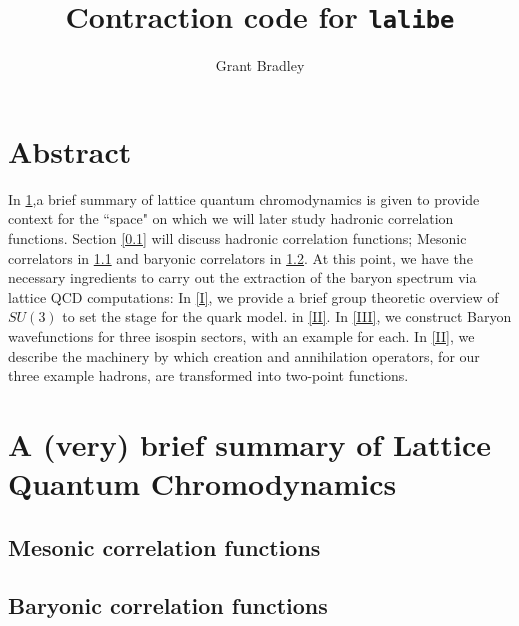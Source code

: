 \documentclass[prd,12pt,superscriptaddress,tightenlines,nofootinbib]{revtex4}
\theoremstyle{plain}
\theoremstyle{definition}
\theoremstyle{remark}
\begin{document}
\title{Contraction code for \texttt{lalibe}}

\author{Grant Bradley}


\maketitle

\section*{Abstract}
In \ref{0},a brief summary of lattice quantum chromodynamics is given to provide context for the ``space" on which we will later
study hadronic correlation functions. Section \ref{0.1} will discuss hadronic correlation functions; Mesonic correlators in \ref{0.1m} and 
baryonic correlators in \ref{0.1b}. At this point, we have the necessary ingredients to carry out the extraction of the baryon spectrum via lattice QCD computations: In \ref{I}, 
we provide a brief group theoretic overview of $SU(3)$ to set the stage for the quark model. 
in \ref{II}. In \ref{III}, we construct Baryon wavefunctions for three isospin sectors,
with an example for each. In \ref{II}, we describe the machinery by which creation and annihilation 
operators, for our three example hadrons, are transformed into two-point functions. 


\section{A (very) brief summary of Lattice Quantum Chromodynamics}\label{0}

\subsection{Mesonic correlation functions}\label{0.1m}

\subsection{Baryonic correlation functions}\label{0.1b}
\end{document}
